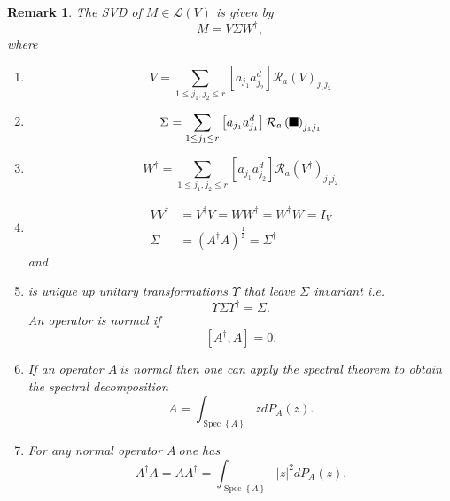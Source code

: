 \documentclass[aps,preprint]{revtex4}%
\providecommand{\U}[1]{\protect\rule{.1in}{.1in}}
\newtheorem{remark}[theorem]{Remark}
\begin{document}
\begin{remark}
The SVD of $M\in\mathcal{L}\left(  V\right)  $ is given by
\begin{equation}
M=V\Sigma W^{\dagger},
\end{equation}
where

\begin{enumerate}
\item
\begin{equation}
V=\sum_{1\leq j_{1},j_{2}\leq r}\left[  a_{j_{1}}a_{j_{2}}^{d}\right]
\mathcal{R}_{a}\left(  V\right)  _{j_{1}j_{2}}%
\end{equation}


\item
\begin{equation}
\Sigma=\sum_{1\leq j_{1}\leq r}\left[  a_{j_{1}}a_{j_{1}}^{d}\right]
\mathcal{R}_{a}\left(  \U{3a3} \right)  _{j_{1}j_{1}}%
\end{equation}


\item
\begin{equation}
W^{\dagger}=\sum_{1\leq j_{1},j_{2}\leq r}\left[  a_{j_{1}}a_{j_{2}}%
^{d}\right]  \mathcal{R}_{a}\left(  V^{\dagger}\right)  _{j_{1}j_{2}}%
\end{equation}


\item
\begin{align}
VV^{\dagger}  &  =V^{\dagger}V=WW^{\dagger}=W^{\dagger}W=I_{V}\\
\Sigma &  =\left(  A^{\dagger}A\right)  ^{\frac{1}{2}}=\Sigma^{\dagger}%
\end{align}
and

\item is unique up unitary transformations $\Upsilon$ that leave $\Sigma$
invariant i.e.
\begin{equation}
\Upsilon\Sigma\Upsilon^{\dagger}=\Sigma.
\end{equation}
An operator is normal if
\begin{equation}
\left[  A^{\dagger},A\right]  =0.
\end{equation}


\item If an operator $A\ $is normal then one can apply the spectral theorem to
obtain the spectral decomposition
\begin{equation}
A=\int_{\operatorname*{Spec}\left\{  A\right\}  }zdP_{A}\left(  z\right)  .
\end{equation}


\item For \emph{any normal operator} $A\ $one has
\begin{equation}
A^{\dagger}A=AA^{\dagger}=\int_{\operatorname*{Spec}\left\{  A\right\}
}\left\vert z\right\vert ^{2}dP_{A}\left(  z\right)  .
\end{equation}

\end{enumerate}
\end{remark}
\end{document}
